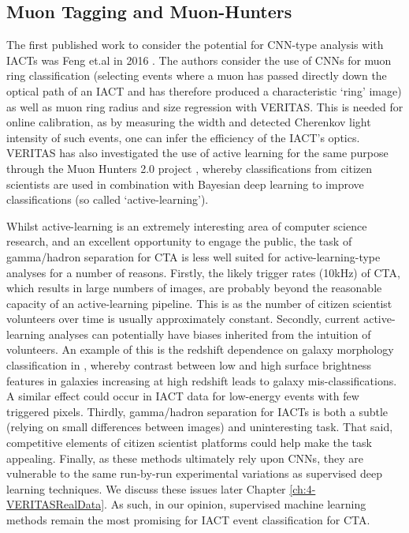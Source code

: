 \subsection{Muon Tagging and Muon-Hunters}
The first published work to consider the potential for CNN-type analysis with IACTs was Feng et.al in 2016 \cite{feng2016}. The authors consider the use of CNNs for muon ring classification (selecting events where a muon has passed directly down the optical path of an IACT and has therefore produced a characteristic `ring' image) as well as muon ring radius and size regression with VERITAS. This is needed for online calibration, as by measuring the width and detected Cherenkov light intensity of such events, one can infer the efficiency of the IACT's optics. VERITAS has also investigated the use of active learning for the same purpose through the Muon Hunters 2.0 project \cite{muonhunters2}, whereby classifications from citizen scientists are used in combination with Bayesian deep learning to improve classifications (so called `active-learning').

Whilst active-learning is an extremely interesting area of computer science research, and an excellent opportunity to engage the public, the task of gamma/hadron separation for CTA is less well suited for active-learning-type analyses for a number of reasons. Firstly, the likely trigger rates (10kHz) \cite{trigrate} of CTA, which results in large numbers of images, are probably beyond the reasonable capacity of an active-learning pipeline. This is as the number of citizen scientist volunteers over time is usually approximately constant. Secondly, current active-learning analyses can potentially have biases inherited from the intuition of volunteers. An example of this is the redshift dependence on galaxy morphology classification in \cite{mike}, whereby contrast between low and high surface brightness features in galaxies increasing at high redshift leads to galaxy mis-classifications. A similar effect could occur in IACT data for low-energy events with few triggered pixels. Thirdly, gamma/hadron separation for IACTs is both a subtle (relying on small differences between images) and uninteresting task. That said, competitive elements of citizen scientist platforms could help make the task appealing. Finally, as these methods ultimately rely upon CNNs, they are vulnerable to the same run-by-run experimental variations as supervised deep learning techniques. We discuss these issues later Chapter \ref{ch:4-VERITASRealData}. As such, in our opinion, supervised machine learning methods remain the most promising for IACT event classification for CTA.


